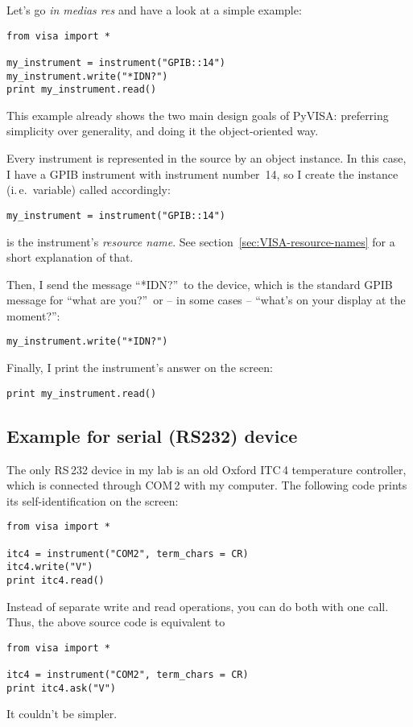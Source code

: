 \documentclass{howto}
\begin{document}
Let's go \emph{in medias res} and have a look at a simple example:
\begin{verbatim}
from visa import *

my_instrument = instrument("GPIB::14")
my_instrument.write("*IDN?")
print my_instrument.read()
\end{verbatim}
This example already shows the two main design goals of PyVISA: preferring
simplicity over generality, and doing it the object-oriented way.

Every instrument is represented in the source by an object instance.  In this case,
I have a GPIB instrument with instrument number~14, so I create the instance
(i.\,e.\ variable) called  accordingly:
\begin{verbatim}
my_instrument = instrument("GPIB::14")
\end{verbatim}
 is the instrument's \emph{resource name}.  See
section~\ref{sec:VISA-resource-names} for a short explanation of that.

Then, I send the message ``*IDN?''\ to the device, which is the standard GPIB
message for ``what are you?''\ or -- in some cases -- ``what's on your display
at the moment?'':
\begin{verbatim}
my_instrument.write("*IDN?")
\end{verbatim}
Finally, I print the instrument's answer on the screen:
\begin{verbatim}
print my_instrument.read()
\end{verbatim}


\subsection{Example for serial (RS232) device}

The only RS\,232 device in my lab is an old Oxford ITC\,4 temperature
controller, which is connected through COM\,2 with my computer.  The following
code prints its self-identification on the screen:
\begin{verbatim}
from visa import *

itc4 = instrument("COM2", term_chars = CR)
itc4.write("V")
print itc4.read()
\end{verbatim}
Instead of separate write and read operations, you can do both with one
 call.  Thus, the above source code is equivalent to
\begin{verbatim}
from visa import *

itc4 = instrument("COM2", term_chars = CR)
print itc4.ask("V")
\end{verbatim}
It couldn't be simpler.
\end{document}
